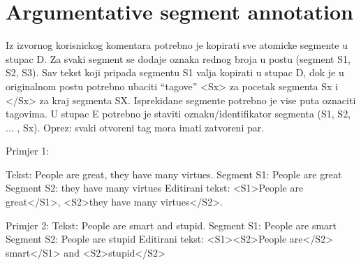 \section{Argumentative segment annotation}

Iz izvornog korisnickog komentara potrebno je kopirati sve atomicke segmente u
stupac D. Za svaki segment se dodaje oznaka rednog broja u postu (segment S1,
S2, S3). Sav tekst koji pripada segmentu S1 valja kopirati u stupac D, dok je u
originalnom postu potrebno ubaciti “tagove” <Sx> za pocetak segmenta Sx i </Sx>
za kraj segmenta SX. Isprekidane segmente potrebno je vise puta oznaciti
tagovima. U stupac E potrebno je staviti oznaku/identifikator segmenta (S1, S2,
... , Sx). Oprez: svaki otvoreni tag mora imati zatvoreni par. 

Primjer 1: 

Tekst: People are great, they have many virtues. 
Segment S1: People are great
Segment S2: they have many virtues
Editirani tekst: <S1>People are great</S1>, <S2>they have many virtues</S2>. 

Primjer 2: 
Tekst: People are smart and stupid. 
Segment S1: People are smart
Segment S2: People are stupid
Editirani tekst: <S1><S2>People are</S2> smart</S1> and <S2>stupid</S2>

